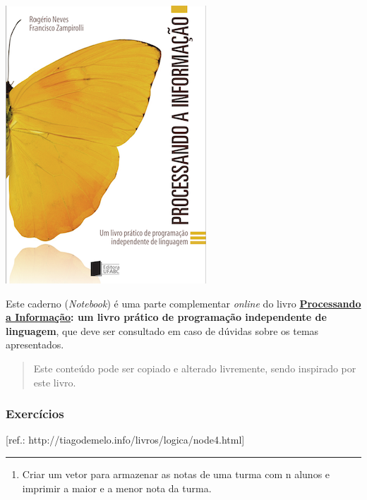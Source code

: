 \documentclass[12pt,a4paper]{article}
\renewcommand{\linethickness}{0.05em}
\providecommand{\tightlist}{%
      \setlength{\itemsep}{0pt}\setlength{\parskip}{0pt}}
\begin{document}
    \includegraphics{"figs/Capa_Processando_Informacao.jpg"}

Este caderno (\emph{Notebook}) é uma parte complementar \emph{online} do
livro
\textbf{\href{https://editora.ufabc.edu.br/matematica-e-ciencias-da-computacao/58-processando-a-informacao}{Processando
a Informação}: um livro prático de programação independente de
linguagem}, que deve ser consultado em caso de dúvidas sobre os temas
apresentados.

\begin{quote}
Este conteúdo pode ser copiado e alterado livremente, sendo inspirado
por este livro.
\end{quote}

    \hypertarget{exercuxedcios}{%
\subsubsection{Exercícios}\label{exercuxedcios}}

{[}ref.: http://tiagodemelo.info/livros/logica/node4.html{]}

    \begin{center}\rule{0.5\linewidth}{\linethickness}\end{center}

\begin{enumerate}
\def\labelenumi{\arabic{enumi}.}
\tightlist
\item
  Criar um vetor para armazenar as notas de uma turma com n alunos e
  imprimir a maior e a menor nota da turma.
\end{enumerate}
\end{document}
